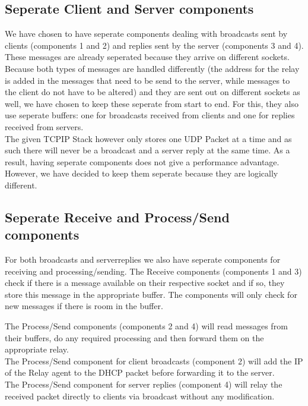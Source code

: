\documentclass[11pt,a4paper]{scrartcl}
\begin{document}
\subsection{Seperate Client and Server components}
We have chosen to have seperate components dealing with broadcasts sent by clients (components 1 and 2) and replies sent by the server (components 3 and 4). These messages are already seperated because they arrive on different sockets. Because both types of messages are handled differently (the address for the relay is added in the messages that need to be send to the server, while messages to the client do not have to be altered) and they are sent out on different sockets as well, we have chosen to keep these seperate from start to end. For this, they also use seperate buffers: one for broadcasts received from clients and one for replies received from servers.\\
The given TCPIP Stack however only stores one UDP Packet at a time and as such there will never be a broadcast and a server reply at the same time. As a result, having seperate components does not give a performance advantage. However, we have decided to keep them seperate because they are logically different.

\subsection{Seperate Receive and Process/Send components}
For both broadcasts and serverreplies we also have seperate components for receiving and processing/sending. The Receive components (components 1 and 3) check if there is a message available on their respective socket and if so, they store this message in the appropriate buffer. The components will only check for new messages if there is room in the buffer.

The Process/Send components (components 2 and 4) will read messages from their buffers, do any required processing and then forward them on the appropriate relay.\\
The Process/Send component for client broadcasts (component 2) will add the IP of the Relay agent to the DHCP packet before forwarding it to the server.\\
The Process/Send component for server replies (component 4) will relay the received packet directly to clients via broadcast without any modification.
\end{document}
